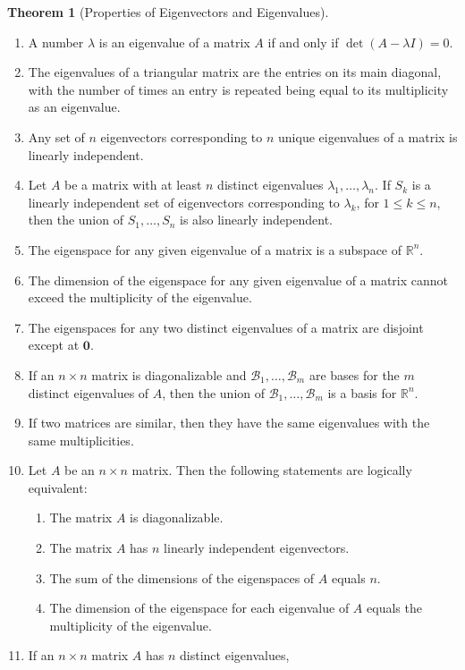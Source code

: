 \documentclass{myart}
\renewcommand{\vec}[1]{\ensuremath{\mathbf{#1}}}
\newcommand{\mat}[1]{\ensuremath{#1}}
\newcommand{\R}[1][]{\ensuremath{\mathbb{R}^{#1}}}
\newcommand{\by}{\ensuremath{\times}}
\newcommand{\basis}[1]{\ensuremath{\mathcal{#1}}}
\newcommand{\many}[2][n]{\ensuremath{{#2}_1, \ldots, {#2}_{#1}}}
\theoremstyle{definition}
\newtheorem{thm}{Theorem}
\begin{document}
\begin{thm}[Properties of Eigenvectors and Eigenvalues] \hfill
  \begin{enumerate}
  \item A number $\lambda$ is an eigenvalue of a matrix \mat A if and
    only if $\det(\mat A - \lambda\mat I) = 0$.
  \item The eigenvalues of a triangular matrix are the entries on its
    main diagonal, with the number of times an entry is repeated being
    equal to its multiplicity as an eigenvalue.
  \item Any set of $n$ eigenvectors corresponding to $n$ unique
    eigenvalues of a matrix is linearly independent.
  \item Let \mat A be a matrix with at least $n$ distinct eigenvalues
    \many{\lambda}. If $S_k$ is a linearly independent set of
    eigenvectors corresponding to $\lambda_k$, for $1 \leq k \leq n$,
    then the union of \many{S} is also linearly independent.
  \item The eigenspace for any given eigenvalue of a matrix is a
    subspace of \R[n].
  \item The dimension of the eigenspace for any given eigenvalue of a
    matrix cannot exceed the multiplicity of the eigenvalue.
  \item The eigenspaces for any two distinct eigenvalues of a matrix
    are disjoint except at \vec 0.
  \item If an $n \by n$ matrix is diagonalizable and \many[m]{\basis
      B} are bases for the $m$ distinct eigenvalues of \mat A, then
    the union of \many[m]{\basis B} is a basis for \R[n].
  \item If two matrices are similar, then they have the same
    eigenvalues with the same multiplicities.
  \item Let \mat A be an $n \by n$ matrix. Then the following
    statements are logically equivalent:
    \begin{enumerate}
    \item The matrix \mat A is diagonalizable.
    \item The matrix \mat A has $n$ linearly independent eigenvectors.
    \item The sum of the dimensions of the eigenspaces of \mat A
      equals $n$.
    \item The dimension of the eigenspace for each eigenvalue of \mat
      A equals the multiplicity of the eigenvalue.
    \end{enumerate}
  \item If an $n \by n$ matrix \mat A has $n$ distinct eigenvalues,

\end{enumerate}
\end{thm}
\end{document}
